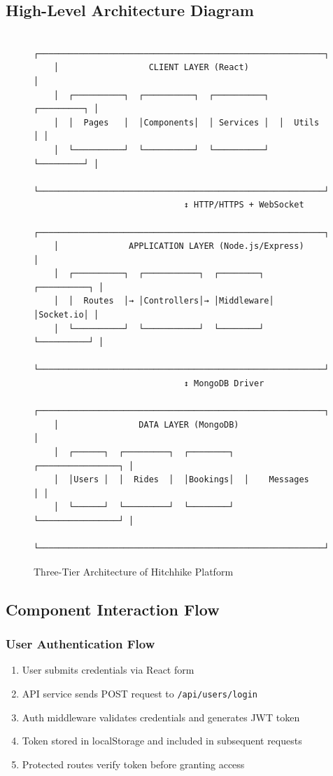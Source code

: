 \documentclass[12pt,a4paper]{article}
\begin{document}
\subsection{High-Level Architecture Diagram}

\begin{figure}[H]
    \centering
    \begin{verbatim}
    ┌─────────────────────────────────────────────────────────┐
    │                  CLIENT LAYER (React)                    │
    │  ┌──────────┐  ┌──────────┐  ┌──────────┐  ┌─────────┐ │
    │  │  Pages   │  │Components│  │ Services │  │  Utils  │ │
    │  └──────────┘  └──────────┘  └──────────┘  └─────────┘ │
    └─────────────────────────────────────────────────────────┘
                              ↕ HTTP/HTTPS + WebSocket
    ┌─────────────────────────────────────────────────────────┐
    │              APPLICATION LAYER (Node.js/Express)         │
    │  ┌──────────┐  ┌───────────┐  ┌────────┐  ┌──────────┐ │
    │  │  Routes  │→ │Controllers│→ │Middleware│ │Socket.io│ │
    │  └──────────┘  └───────────┘  └────────┘  └──────────┘ │
    └─────────────────────────────────────────────────────────┘
                              ↕ MongoDB Driver
    ┌─────────────────────────────────────────────────────────┐
    │                DATA LAYER (MongoDB)                      │
    │  ┌──────┐  ┌─────────┐  ┌────────┐  ┌────────────────┐ │
    │  │Users │  │  Rides  │  │Bookings│  │    Messages    │ │
    │  └──────┘  └─────────┘  └────────┘  └────────────────┘ │
    └─────────────────────────────────────────────────────────┘
    \end{verbatim}
    \caption{Three-Tier Architecture of Hitchhike Platform}
\end{figure}

\subsection{Component Interaction Flow}

\subsubsection{User Authentication Flow}
\begin{enumerate}
    \item User submits credentials via React form
    \item API service sends POST request to \texttt{/api/users/login}
    \item Auth middleware validates credentials and generates JWT token
    \item Token stored in localStorage and included in subsequent requests
    \item Protected routes verify token before granting access
\end{enumerate}
\end{document}
